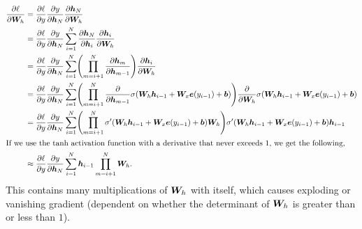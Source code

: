 \begin{align*}
    \pdv{\ell}{\mat{W}_h} & = \pdv{\ell}{y} \pdv{y}{\vec{h}_N} \pdv{\vec{h}_N}{\mat{W}_h}                                                                                                                                                                                                       \\
                          & = \pdv{\ell}{y} \pdv{y}{\vec{h}_N} \sum_{i=1}^N \pdv{\vec{h}_N}{\vec{h}_i} \pdv{\vec{h}_i}{\mat{W}_h}                                                                                                                                                               \\
                          & = \pdv{\ell}{y} \pdv{y}{\vec{h}_N} \sum_{i=1}^N \lft( \prod_{m=i+1}^N \pdv{\vec{h}_m}{\vec{h}_{m-1}} \rgt) \pdv{\vec{h}_i}{\mat{W}_h}                                                                                                                               \\
                          & = \pdv{\ell}{y} \pdv{y}{\vec{h}_N} \sum_{i=1}^N \lft( \prod_{m=i+1}^N
    \pdv*{\sigma\lft( \mat{W}_h\vec{h}_{i-1} + \mat{W}_x\vec{e}(y_{i-1}) + \vec{b} \rgt)}{\vec{h}_{m-1}} \rgt)
    \pdv*{\sigma \lft( \mat{W}_h\vec{h}_{i-1} + \mat{W}_x\vec{e}(y_{i-1}) + \vec{b} \rgt)}{\mat{W}_h}                                                                                                                                                                                           \\
                          & = \pdv{\ell}{y} \pdv{y}{\vec{h}_N} \sum_{i=1}^N \lft( \prod_{m=i+1}^N \sigma' \lft( \mat{W}_h\vec{h}_{i-1} + \mat{W}_x\vec{e}(y_{i-1}) + \vec{b} \rgt) \mat{W}_h \rgt) \sigma'\lft( \mat{W}_h\vec{h}_{i-1} + \mat{W}_x\vec{e}(y_{i-1}) + \vec{b}\rgt) \vec{h}_{i-1} \\
    \intertext{If we use the $\tanh$ activation function with a derivative that
        never exceeds 1, we get the following,}
                          & \approx \pdv{\ell}{y} \pdv{y}{\vec{h}_N} \sum_{i=1}^N \vec{h}_{i-1} \prod_{m=i+1}^N \mat{W}_h.
\end{align*}
This contains many multiplications of $\bm{W}_h$ with itself, which causes
exploding or vanishing gradient (dependent on whether the determinant of
$\bm{W}_h$ is greater than or less than $1$).
